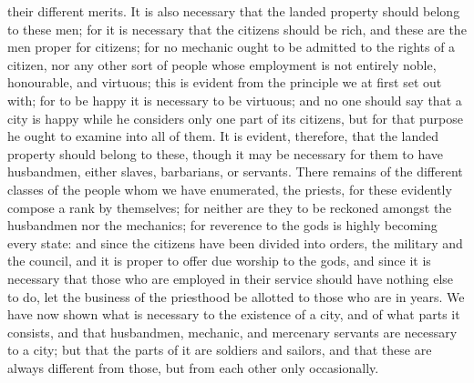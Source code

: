 their different merits. It is also necessary that the landed property
should belong to these men; for it is necessary that the citizens should
be rich, and these are the men proper for citizens; for no mechanic ought
to be admitted to the rights of a citizen, nor any other sort of people
whose employment is not entirely noble, honourable, and virtuous; this is
evident from the principle we at first set out with; for to be happy it is
necessary to be virtuous; and no one should say that a city is happy while
he considers only one part of its citizens, but for that purpose he ought
to examine into all of them. It is evident, therefore, that the landed
property should belong to these, though it may be necessary for them to
have husbandmen, either slaves, barbarians, or servants. There remains of
the different classes of the people whom we have enumerated, the priests,
for these evidently compose a rank by themselves; for neither are they to
be reckoned amongst the husbandmen nor the mechanics; for reverence to the
gods is highly becoming every state: and since the citizens have been
divided into orders, the military and the council, and it is proper to
offer due worship to the gods, and since it is necessary that those who
are employed in their service should have nothing else to do, let the
business of the priesthood be allotted to those who are in years. We have
now shown what is necessary to the existence of a city, and of what parts
it consists, and that husbandmen, mechanic, and mercenary servants are
necessary to a city; but that the parts of it are soldiers and sailors,
and that these are always different from those, but from each other only
occasionally.


